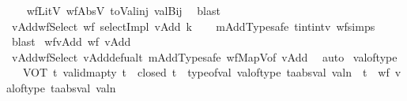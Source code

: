 \begin{isabellebody}
\ \ \isamarkupfalse%
\ wfLitV\ wfAbsV\ toVal{}{}{}{}{\isacharunderscore}{\kern0pt}inj\ valBij\ \isamarkupfalse%
\ blast{\isacharplus}{\kern0pt}\isanewline
\ \ \isamarkupfalse%
%
\endisatagproof
{\isafoldproof}%
%
\isadelimproof
\isanewline
%
\endisadelimproof
\isanewline
{}\isamarkupfalse%
\ vAdd{}wfSelect{\isacharcolon}{\kern0pt}\ {\isachardoublequoteopen}wf\ {\isacharparenleft}{\kern0pt}selectImpl\ vAdd{}\ k{\isacharparenright}{\kern0pt}{\isachardoublequoteclose}\isanewline
%
\isadelimproof
\ \ %
\endisadelimproof
%
\isatagproof
{}\isamarkupfalse%
\ mAdd{}Typesafe\ tint{\isacharunderscore}{\kern0pt}intv\ wf{\isachardot}{\kern0pt}simps\ \isamarkupfalse%
\ blast%
\endisatagproof
{\isafoldproof}%
%
\isadelimproof
\isanewline
%
\endisadelimproof
\isanewline
{}\isamarkupfalse%
\ wf{\isacharunderscore}{\kern0pt}vAdd{}{\isacharcolon}{\kern0pt}\ {\isachardoublequoteopen}wf\ vAdd{}{\isachardoublequoteclose}\isanewline
%
\isadelimproof
\ \ %
\endisadelimproof
%
\isatagproof
{}\isamarkupfalse%
\ vAdd{}wfSelect\ vAdd{}defualt\ mAdd{}Typesafe\ wfMapV{\isacharbrackleft}{\kern0pt}of\ vAdd{}{\isacharbrackright}{\kern0pt}\ \isamarkupfalse%
\ auto%
\endisatagproof
{\isafoldproof}%
%
\isadelimproof
%
\endisadelimproof
%
\isadelimdocument
%
\endisadelimdocument
%
\isatagdocument
%
\isamarkuptrue%
%
\endisatagdocument
{\isafolddocument}%
%
\isadelimdocument
%
\endisadelimdocument
{}\isamarkupfalse%
\ valoftype\ {\isacharequal}{\kern0pt}\isanewline
\ \ \ VOT{\isacharcolon}{\kern0pt}\ {\isachardoublequoteopen}{\isasymAnd}t{\isachardot}{\kern0pt}\ valid{\isacharunderscore}{\kern0pt}mapty\ t\ {\isasymLongrightarrow}\ closed\ t\ {\isasymLongrightarrow}\ {\isacharparenleft}{\kern0pt}type{\isacharunderscore}{\kern0pt}of{\isacharunderscore}{\kern0pt}val\ {\isacharparenleft}{\kern0pt}{\isacharparenleft}{\kern0pt}val{\isacharunderscore}{\kern0pt}of{\isacharunderscore}{\kern0pt}type\ t{\isacharparenright}{\kern0pt}{\isacharcolon}{\kern0pt}{\isacharcolon}{\kern0pt}{\isacharprime}{\kern0pt}a{\isacharcolon}{\kern0pt}{\isacharcolon}{\kern0pt}absval\ valn{\isacharparenright}{\kern0pt}\ {\isacharequal}{\kern0pt}\ t\ {\isasymand}\ wf\ {\isacharparenleft}{\kern0pt}{\isacharparenleft}{\kern0pt}val{\isacharunderscore}{\kern0pt}of{\isacharunderscore}{\kern0pt}type\ t{\isacharparenright}{\kern0pt}{\isacharcolon}{\kern0pt}{\isacharcolon}{\kern0pt}{\isacharprime}{\kern0pt}a{\isacharcolon}{\kern0pt}{\isacharcolon}{\kern0pt}absval\ valn{\isacharparenright}{\kern0pt}{\isacharparenright}{\kern0pt}{\isachardoublequoteclose}\isanewline

\end{isabellebody}
